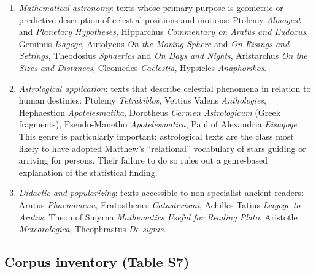 \documentclass[11pt,a4paper]{article}
\begin{document}
\begin{enumerate}
  \item \textit{Mathematical astronomy}: texts whose primary purpose is
    geometric or predictive description of celestial positions and
    motions: Ptolemy \textit{Almagest} and \textit{Planetary Hypotheses},
    Hipparchus \textit{Commentary on Aratus and Eudoxus}, Geminus
    \textit{Isagoge}, Autolycus \textit{On the Moving Sphere} and \textit{On
    Risings and Settings}, Theodosius \textit{Sphaerics} and \textit{On Days
    and Nights}, Aristarchus \textit{On the Sizes and Distances}, Cleomedes
    \textit{Caelestia}, Hypsicles \textit{Anaphorikos}.

  \item \textit{Astrological application}: texts that describe celestial
    phenomena in relation to human destinies: Ptolemy \textit{Tetrabiblos},
    Vettius Valens \textit{Anthologies}, Hephaestion \textit{Apotelesmatika},
    Dorotheus \textit{Carmen Astrologicum} (Greek fragments),
    Pseudo-Manetho \textit{Apotelesmatica}, Paul of Alexandria
    \textit{Eisagoge}. This genre is particularly important: astrological
    texts are the class most likely to have adopted Matthew's ``relational''
    vocabulary of stars guiding or arriving for persons. Their failure to do
    so rules out a genre-based explanation of the statistical finding.

  \item \textit{Didactic and popularizing}: texts accessible to
    non-specialist ancient readers: Aratus \textit{Phaenomena}, Eratosthenes
    \textit{Catasterismi}, Achilles Tatius \textit{Isagoge to Aratus},
    Theon of Smyrna \textit{Mathematics Useful for Reading Plato},
    Aristotle \textit{Meteorologica}, Theophrastus \textit{De signis}.
\end{enumerate}

\subsection{Corpus inventory (Table S7)}
\end{document}
